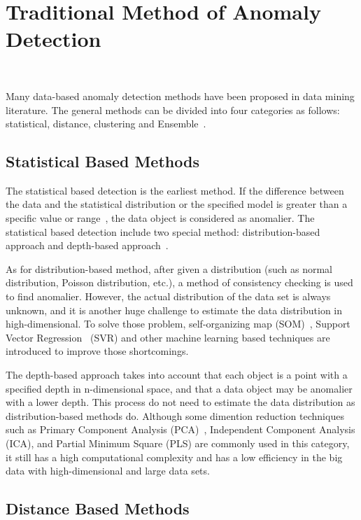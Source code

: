 \section{Traditional Method of Anomaly Detection}~\label{sec-method}

Many data-based anomaly detection methods have been proposed in
data mining literature.
The general methods can be divided into four categories as follows:
statistical,
distance,
clustering and Ensemble~\cite{cook2019anomaly}.

\subsection{Statistical Based Methods}

The statistical based detection is the earliest method. 
If the difference between the data and the statistical 
distribution or the specified model 
is greater than a specific value or range~\cite{chandola2009anomaly}, 
the data object is considered as anomalier. 
The statistical based detection include two special method: 
distribution-based approach and 
depth-based approach~\cite{wu2016survey}.

As for distribution-based method,
after given a distribution (such as
normal distribution,
Poisson distribution,
etc.),
a method of consistency checking is used to find anomalier.
However,
the actual distribution of the data set is always unknown,
and it is another huge challenge to
estimate the data distribution in high-dimensional.
To solve those problem,
self-organizing map (SOM)~\cite{siripanadorn2010anomaly},
Support Vector Regression~\cite{kromanis2013support} (SVR) and
other machine learning based techniques are introduced to
improve those shortcomings.

The depth-based approach takes into account 
that each object is a point with 
a specified depth in n-dimensional space, 
and that a data object  may be anomalier with a lower depth. 
This process do not need to estimate the data distribution as
distribution-based methods do. 
Although some dimention reduction techniques such as  
Primary Component Analysis (PCA)~\cite{deng2013modified}, 
Independent Component Analysis (ICA), 
and Partial Minimum Square (PLS)\cite{yin2014improved} 
are commonly used in this category,
it still has a high computational complexity and 
has a low efficiency in the big data with 
high-dimensional and large data sets.

\subsection{Distance Based Methods}

